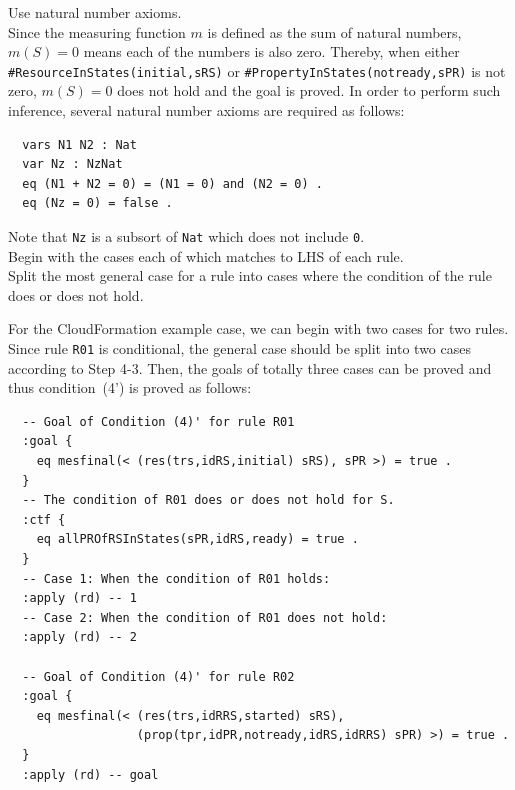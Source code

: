 \documentclass[12pt]{report}
\newcommand{\stt}[1]{{\small{\tt {#1}}}}
\begin{document}
\vspace{0.3cm}
 Use natural number axioms. \\ Since the
measuring function $m$ is defined as the sum of natural numbers, $m(S)
= 0$ means each of the numbers is also zero. Thereby, when either
\stt{\#ResourceInStates(initial,sRS)} or
\stt{\#PropertyInStates(notready,sPR)} is not zero, $m(S) = 0$ does
not hold and the goal is proved. In order to perform such inference,
several natural number axioms are required as follows:
\small
\begin{verbatim}
  vars N1 N2 : Nat
  var Nz : NzNat
  eq (N1 + N2 = 0) = (N1 = 0) and (N2 = 0) .
  eq (Nz = 0) = false .
\end{verbatim}
\normalsize
Note that {\tt Nz} is a subsort of {\tt Nat} which does not
include {\tt 0}.\\

\vspace{0.3cm}
 Begin with the cases each of which matches to
LHS of each rule. \\ 
 Split the most general case for a rule into
cases where the condition of the rule does or does not hold. 

For the CloudFormation example case, we can begin with two cases for
two rules. Since rule {\tt R01} is conditional, the general case
should be split into two cases according to Step 4-3. Then, the goals
of totally three cases can be proved and thus condition~(4') is proved
as follows:
\small
\begin{verbatim}
  -- Goal of Condition (4)' for rule R01
  :goal {
    eq mesfinal(< (res(trs,idRS,initial) sRS), sPR >) = true .
  }
  -- The condition of R01 does or does not hold for S.
  :ctf {
    eq allPROfRSInStates(sPR,idRS,ready) = true .
  }
  -- Case 1: When the condition of R01 holds:
  :apply (rd) -- 1
  -- Case 2: When the condition of R01 does not hold:
  :apply (rd) -- 2

  -- Goal of Condition (4)' for rule R02
  :goal {
    eq mesfinal(< (res(trs,idRRS,started) sRS),
                  (prop(tpr,idPR,notready,idRS,idRRS) sPR) >) = true .
  }
  :apply (rd) -- goal
\end{verbatim}
\normalsize
\end{document}
